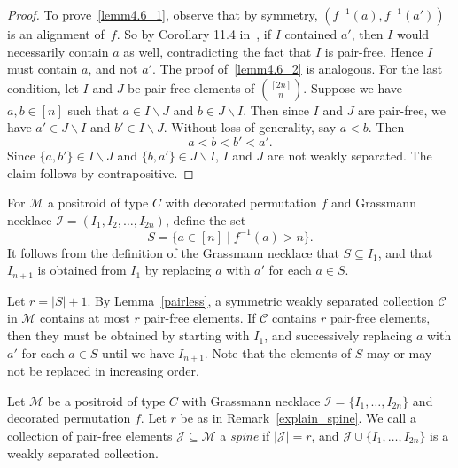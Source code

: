 \documentclass[ALCO,ThmDefs,Unicode,epreuves]{cedram}
\begin{document}
\begin{proof}
To prove~\eqref{lemm4.6_1}, observe that by symmetry, $(f^{-1}(a),f^{-1}(a'))$ is an alignment of~$f$. So by Corollary 11.4 in~\cite{OPS15}, if $I$ contained $a'$, then $I$ would necessarily contain $a$ as well, contradicting the fact that $I$ is pair-free. Hence $I$ must contain $a$, and not $a'$. The proof of~\eqref{lemm4.6_2} is analogous. For the last condition, let $I$ and $J$ be pair-free elements of $\binom{[2n]}{n}$. Suppose we have $a,b \in [n]$ such that $a \in I \backslash J$ and $b \in J \backslash I$. Then since $I$ and $J$ are pair-free, we have
$a' \in J \backslash I$ and $b' \in I \backslash J$. Without loss of generality, say $a < b$. Then
\[a < b < b' < a'.\]
Since $\{a,b'\} \in I \backslash J$ and $\{b,a'\} \in J \backslash I$, $I$ and $J$ are not weakly separated. The claim follows by contrapositive. 
\end{proof}

\begin{rema}
\label{explain_spine}
For $\mathcal{M}$ a positroid of type $C$ with decorated permutation $f$ and Grassmann necklace $\mathcal{I}= (I_1, I_2, \ldots, I_{2n})$, define the set
\begin{equation}
	S = \{a \in [n] \mid f^{-1}(a) > n\}.
\end{equation}
It follows from the definition of the Grassmann necklace that $S \subseteq I_1$, and that $I_{n+1}$ is obtained from $I_1$ by replacing $a$ with $a'$ for each $a \in S$.

Let $r = |S| + 1$. By Lemma~\ref{pairless}, a symmetric weakly separated collection $\mathcal{C}$ in $\mathcal{M}$ contains at most $r$ pair-free elements. If $\mathcal{C}$ contains $r$ pair-free elements, then they must be obtained by starting with $I_1$, and successively replacing $a$ with $a'$ for each $a \in S$ until we have $I_{n+1}$. Note that the elements of $S$ may or may not be replaced in increasing order.
\end{rema}

\begin{defi}
Let $\mathcal{M}$ be a positroid of type $C$ with Grassmann necklace $\mathcal{I}=\{I_1,\ldots,I_{2n}\}$ and decorated permutation $f$. Let $r$ be as in Remark~\ref{explain_spine}. We call a collection of pair-free elements $\mathcal{J} \subseteq \mathcal{M}$ a \emph{spine} if $|\mathcal{J}| = r$, and $\mathcal{J} \cup \{I_1,\ldots,I_{2n}\}$
is a weakly separated collection. 
\end{defi}
\end{document}
